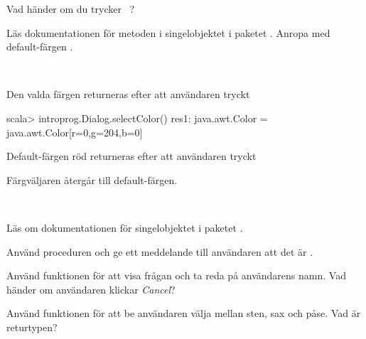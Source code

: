 \Subtask Vad händer om du trycker ~?

\Subtask Läs  dokumentationen för metoden  i singelobjektet  i paketet . Anropa  med default-färgen .

\SOLUTION

\TaskSolved \what~

\Subtask Den valda färgen returneras efter att användaren tryckt 
\begin{REPL}
scala> introprog.Dialog.selectColor()
res1: java.awt.Color = java.awt.Color[r=0,g=204,b=0]
\end{REPL}


\Subtask Default-färgen röd returneras efter att användaren tryckt 

\Subtask Färgväljaren återgår till default-färgen.

\QUESTEND




\QUESTBEGIN

\Task \what~

\Subtask Läs om dokumentationen för singelobjektet  i paketet .

\Subtask Använd proceduren  och ge ett meddelande till användaren att det är .

\Subtask Använd funktionen  för att visa frågan  och ta reda på användarens namn. Vad händer om användaren klickar \emph{Cancel}?

\Subtask Använd funktionen  för att be användaren välja mellan sten, sax och påse. Vad är returtypen?


